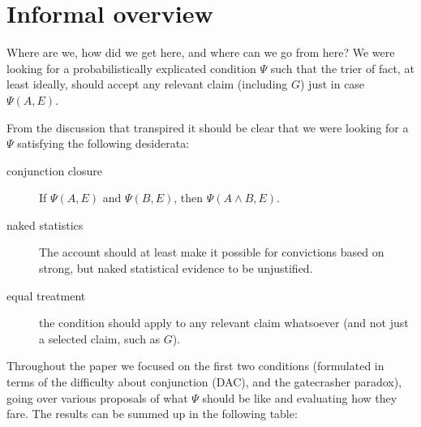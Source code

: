 \documentclass{ifcolog}
\newcommand{\et}{\wedge}
\begin{document}
\section{Informal overview}\label{sec:informaloverview}



Where are we, how did we get here, and where can we go from here?
 We were looking for a probabilistically explicated condition $\Psi$ such that the trier of fact, at least ideally, should accept any relevant claim (including $G$) just in case $\Psi(A,E)$.

From the discussion that transpired it should be clear that we were looking for a $\Psi$ satisfying the following desiderata:

\begin{description}
\item[conjunction closure] If $\Psi(A,E)$ and $\Psi(B,E)$, then $\Psi(A\et B,E)$.
\item[naked statistics] The account should at least make it possible for convictions based on strong, but naked statistical evidence to be unjustified. 
\item[equal treatment] the condition should apply to any relevant claim whatsoever (and not just a selected claim, such as $G$).
\end{description}


Throughout the paper we focused on the first two conditions (formulated in terms of the difficulty about conjunction (DAC), and the gatecrasher paradox), going over various proposals of what $\Psi$ should be like and evaluating how they fare. The results can be summed up in the following table:
\end{document}
